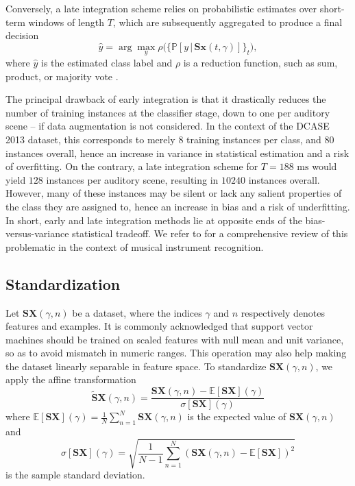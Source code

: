 \documentclass[journal]{IEEEtran}
\begin{document}
Conversely, a late integration scheme relies on probabilistic estimates over short-term windows of length $T$, which are subsequently aggregated to produce a final decision
\begin{equation}
\hat{y} = \arg \max_{y} \rho\Big(\big\{ \mathbb{P}\left[y \,\vert\, \mathbf{S}\boldsymbol{x}(t,\gamma) \right] \big\}_{t} \Big),
\end{equation}
where $\hat{y}$ is the estimated class label and $\rho$ is a reduction function, such as sum, product, or majority vote \cite{Kittler1998}.

The principal drawback of early integration is that it drastically reduces the number of training instances at the classifier stage, down to one per auditory scene -- if data augmentation is not considered.
In the context of the DCASE 2013 dataset, this corresponds to merely $8$ training instances per class, and $80$ instances overall, hence an increase in variance in statistical estimation and a risk of overfitting.
On the contrary, a late integration scheme for $T=188\textrm{ ms}$ would yield $128$ instances per auditory scene, resulting in $10240$ instances overall.
However, many of these instances may be silent or lack any salient properties of the class they are assigned to, hence an increase in bias and a risk of underfitting.
In short, early and late integration methods lie at opposite ends of the bias-versus-variance statistical tradeoff. We refer to \cite{Joder2009} for a comprehensive review of this problematic in the context of musical instrument recognition.

\subsection{Standardization}
\label{sec:stand}

Let $\mathbf{S}\boldsymbol{X}(\gamma,n)$ be a dataset, where the indices $\gamma$ and $n$ respectively denotes features and examples.
It is commonly acknowledged that support vector machines should be trained on scaled features with null mean and unit variance, so as to avoid mismatch in numeric ranges.
This operation may also help making the dataset linearly separable in feature space.
To standardize $\mathbf{S}\boldsymbol{X}(\gamma,n)$, we apply the affine transformation
\begin{equation}
\widetilde{\mathbf{S}}\boldsymbol{X}(\gamma, n) =
\dfrac{ \mathbf{S}\boldsymbol{X}(\gamma, n) -
\mathbb{E}[ \mathbf{S}\boldsymbol{X}](\gamma)}{\sigma[ \mathbf{S}\boldsymbol{X}](\gamma)}
\end{equation}
where $\mathbb{E}[ \mathbf{S}\boldsymbol{X}](\gamma) = \frac{1}{N} \sum_{n=1}^{N} \mathbf{S}\boldsymbol{X}(\gamma,n)$ is the expected value of $\mathbf{S}\boldsymbol{X}(\gamma,n)$ and
\begin{equation}
\sigma[\mathbf{S}\boldsymbol{X}] (\gamma) =
\sqrt{\frac{1}{N-1} \sum_{n=1}^{N}
\left( \mathbf{S}\boldsymbol{X}(\gamma,n) - \mathbb{E}[\mathbf{S}\boldsymbol{X}] \right)^2}
\end{equation}
 is the sample standard deviation.
 
\end{document}
